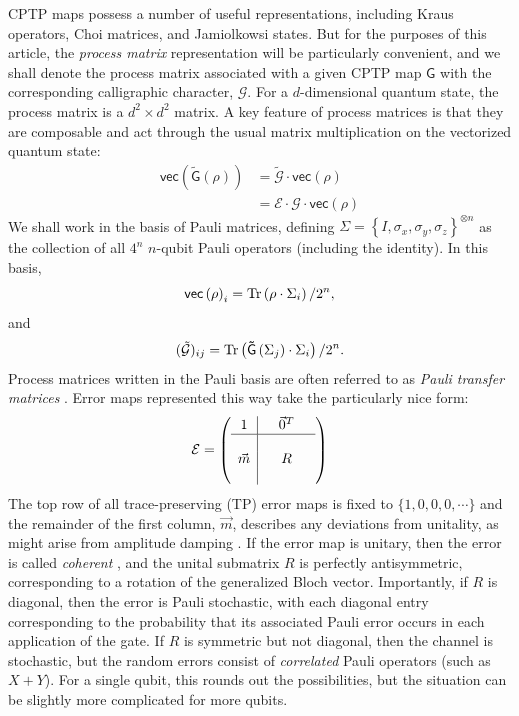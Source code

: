\documentclass[aps,nofootinbib,pra,notitlepage,twocolumn]{revtex4-1}
\newcommand{\tr}{{\rm Tr\thinspace}}
\newcommand{\note}[1]{}
\newcommand{\vectorize}[1]{\ensuremath{\mathsf{vec}\left(#1\right)}}
\begin{document}
CPTP maps possess a number of useful representations, including Kraus operators\cite{1983}, Choi matrices\cite{Choi1975}, and Jamiolkowsi states\cite{yczkowski2004}. But for the purposes of this article, the \emph{process matrix} representation will be particularly convenient\cite{OBrien2004}, and we shall denote the process matrix associated with a given CPTP map $\mathsf{G}$ with the corresponding calligraphic character, $\mathcal{G}$. For a $d$-dimensional quantum state, the process matrix is a $d^2\times d^2$ matrix. A key feature of process matrices is that they are composable and act through the usual matrix multiplication on the vectorized quantum state:
\begin{align}
	\vectorize{\mathsf{\tilde G}(\rho)}
		&= \mathcal{\tilde G}\cdot\vectorize{\rho} \\
		&= \mathcal{E}\cdot\mathcal{G}\cdot\vectorize{\rho}
\end{align}
We shall work in the basis of Pauli matrices, defining $\Sigma = \left\{I, \sigma_x, \sigma_y, \sigma_z\right\}^{\otimes n}$ as the collection of all $4^n$ $n$-qubit Pauli operators (including the identity).  In this basis,
\begin{equation}
  \vectorize{\rho}_i = \tr\!\left(\rho \cdot\Sigma_i\right)/2^n,
\end{equation}
and
\begin{equation}
	(\mathcal{\tilde G})_{ij} = \tr\!\left(\mathsf{\tilde G}\left(\Sigma_j\right) \cdot\Sigma_i\right)/2^n.
\end{equation}
Process matrices written in the Pauli basis are often referred to as \emph{Pauli transfer matrices} \cite{Chow2012}.  Error maps represented this way take the particularly nice form:
\begin{equation}\label{eq:process_matrix}
\mathcal{E} =
	\left(\begin{array}{c|cccc}
		1 &  & \vec{0}^T & \\ 
		\hline & &  &  \\
		\vec{m} &  & R &  \\
		 &  &  & 
	\end{array} 	
	\right)
\end{equation}
The top row of all trace-preserving (TP) error maps is fixed to $\{1,0,0,0,\cdots\}$ and the remainder of the first column, $\vec{m}$, describes any deviations from unitality, as might arise from amplitude damping \note{[]}. If the error map is unitary, then the error is called \textit{coherent} , and the unital submatrix $R$ is perfectly antisymmetric, corresponding to a rotation of the generalized Bloch vector. Importantly, if $R$ is diagonal, then the error is Pauli stochastic, with each diagonal entry corresponding to the probability that its associated Pauli error occurs in each application of the gate. If $R$ is symmetric but not diagonal, then the channel is stochastic, but the random errors consist of \emph{correlated} Pauli operators (such as $X+Y$). For a single qubit, this rounds out the possibilities, but the situation can be slightly more complicated for more qubits.
\end{document}
